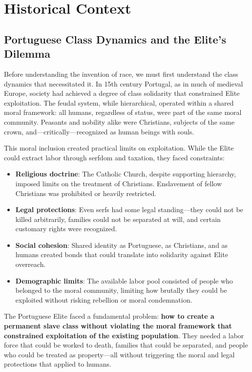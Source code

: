 \documentclass[12pt,openany]{book}
\begin{document}
\chapter{Historical Context}

\section{Portuguese Class Dynamics and the Elite's Dilemma}

Before understanding the invention of race, we must first understand the class dynamics that necessitated it. In 15th century Portugal, as in much of medieval Europe, society had achieved a degree of class solidarity that constrained Elite exploitation. The feudal system, while hierarchical, operated within a shared moral framework: all humans, regardless of status, were part of the same moral community. Peasants and nobility alike were Christians, subjects of the same crown, and---critically---recognized as human beings with souls.

This moral inclusion created practical limits on exploitation. While the Elite could extract labor through serfdom and taxation, they faced constraints:
\begin{itemize}
    \item \textbf{Religious doctrine}: The Catholic Church, despite supporting hierarchy, imposed limits on the treatment of Christians. Enslavement of fellow Christians was prohibited or heavily restricted.
    \item \textbf{Legal protections}: Even serfs had some legal standing---they could not be killed arbitrarily, families could not be separated at will, and certain customary rights were recognized.
    \item \textbf{Social cohesion}: Shared identity as Portuguese, as Christians, and as humans created bonds that could translate into solidarity against Elite overreach.
    \item \textbf{Demographic limits}: The available labor pool consisted of people who belonged to the moral community, limiting how brutally they could be exploited without risking rebellion or moral condemnation.
\end{itemize}

The Portuguese Elite faced a fundamental problem: \textbf{how to create a permanent slave class without violating the moral framework that constrained exploitation of the existing population}. They needed a labor force that could be worked to death, families that could be separated, and people who could be treated as property---all without triggering the moral and legal protections that applied to humans.
\end{document}
